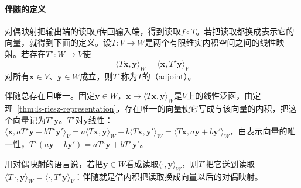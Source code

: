 \paragraph{伴随的定义}
对偶映射把输出端的读取$f$传回输入端，得到读取$f\circ T$。若把读取都换成表示它的向量，就得到下面的定义。设$T:V\to W$是两个有限维实内积空间之间的线性映射。若存在$T^\star:W\to V$使
\begin{equation}
 \langle T\bm x,\bm y\rangle_W=\langle\bm x,T^\star\bm y\rangle_V
 \label{eq:ls-adjoint-pairing}
\end{equation}
对所有$\bm x\in V$、$\bm y\in W$成立，则$T^\star$称为$T$的（adjoint）。
\label{def:linear-algebra-adjoint}

伴随总存在且唯一。固定$\bm y\in W$，$\bm x\mapsto\langle T\bm x,\bm y\rangle_W$是$V$上的线性泛函，由定理~\ref{thm:ls-riesz-representation}，存在唯一的向量使它写成与该向量的内积，把这个向量记为$T^\star\bm y$。$T^\star$对$\bm y$线性：$\langle\bm x,aT^\star\bm y+bT^\star\bm y'\rangle_V=a\langle T\bm x,\bm y\rangle_W+b\langle T\bm x,\bm y'\rangle_W=\langle T\bm x,a\bm y+b\bm y'\rangle_W$，由表示向量的唯一性，$T^\star(a\bm y+b\bm y')=aT^\star\bm y+bT^\star\bm y'$。

用对偶映射的语言说，若把$\bm y\in W$看成读取$\langle\cdot,\bm y\rangle_W$，则$T'$把它送到读取$\langle T\,\cdot,\bm y\rangle_W=\langle\cdot,T^\star\bm y\rangle_V$：伴随就是借内积把读取换成向量以后的对偶映射。

